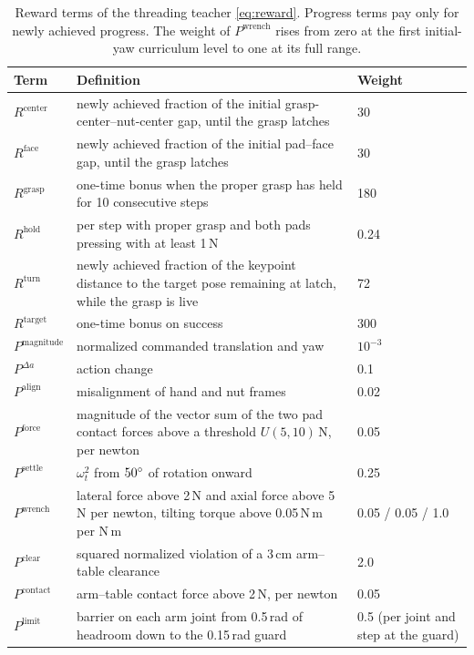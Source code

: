 \begin{table}[!htbp]%
    \centering%
    \caption{Reward terms of the threading teacher \eqref{eq:reward}. Progress terms pay only for newly achieved progress. The weight of $P^{\mathrm{wrench}}$ rises from zero at the first initial-yaw curriculum level to one at its full range.}%
    \label{tab:reward}%
    \small
\begin{tabularx}{\textwidth}{lYl}
        \toprule
        Term & Definition & Weight \\
        \midrule
        $R^{\mathrm{center}}$ & newly achieved fraction of the initial grasp-center--nut-center gap, until the grasp latches & 30 \\
        $R^{\mathrm{face}}$ & newly achieved fraction of the initial pad--face gap, until the grasp latches & 30 \\
        $R^{\mathrm{grasp}}$ & one-time bonus when the proper grasp has held for 10 consecutive steps & 180 \\
        $R^{\mathrm{hold}}$ & per step with proper grasp and both pads pressing with at least 1\,N & 0.24 \\
        $R^{\mathrm{turn}}$ & newly achieved fraction of the keypoint distance to the target pose remaining at latch, while the grasp is live & 72 \\
        $R^{\mathrm{target}}$ & one-time bonus on success & 300 \\
        \midrule
        $P^{\mathrm{magnitude}}$ & normalized commanded translation and yaw & $10^{-3}$ \\
        $P^{\Delta a}$ & action change & 0.1 \\
        $P^{\mathrm{align}}$ & misalignment of hand and nut frames & 0.02 \\
        $P^{\mathrm{force}}$ & magnitude of the vector sum of the two pad contact forces above a threshold $U(5,10)$\,N, per newton & 0.05 \\
        $P^{\mathrm{settle}}$ & $\omega_t^2$ from $50^\circ$ of rotation onward & 0.25 \\
        $P^{\mathrm{wrench}}$ & lateral force above 2\,N and axial force above 5\,N per newton, tilting torque above 0.05\,N\,m per N\,m & 0.05 / 0.05 / 1.0 \\
        $P^{\mathrm{clear}}$ & squared normalized violation of a 3\,cm arm--table clearance & 2.0 \\
        $P^{\mathrm{contact}}$ & arm--table contact force above 2\,N, per newton & 0.05 \\
        $P^{\mathrm{limit}}$ & barrier on each arm joint from 0.5\,rad of headroom down to the 0.15\,rad guard & 0.5 (per joint and step at the guard) \\
        \bottomrule
    \end{tabularx}
\end{table}%

